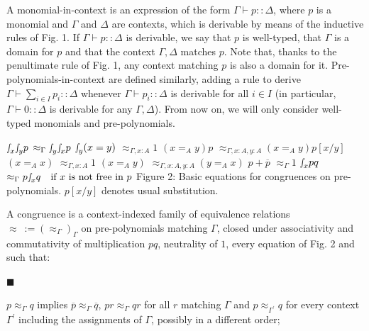  
 
A monomial-in-context is an expression of the form $\Gamma\vdash p::\Delta$, where $p$ is a monomial and $\Gamma$ and $\Delta$ are contexts, which is derivable by means of the inductive rules of Fig. 1. If $\Gamma\vdash p::\Delta$ is derivable, we say that $p$ is well-typed, that $\Gamma$ is a domain for $p$ and that the context $\Gamma,\Delta$ matches $p$. Note that, thanks to the penultimate rule of Fig. 1, any context matching $p$ is also a domain for it. Pre-polynomials-in-context are defined similarly, adding a rule to derive $\Gamma\vdash\sum_{i\in I}p_{i}::\Delta$ whenever $\Gamma\vdash p_{i}::\Delta$ is derivable for all $i\in I$ (in particular, $\Gamma\vdash 0::\Delta$ is derivable for any $\Gamma,\Delta$). From now on, we will only consider well-typed monomials and pre-polynomials.\par
 
 
    $\displaystyle{\smallint\!}_{x}{\smallint\!}_{y}p$ $\displaystyle\approx_{\Gamma}{\smallint\!}_{y}{\smallint\!}_{x}p$ $\displaystyle{\smallint\!}_{y}(x=y)$ $\displaystyle\approx_{\Gamma,x:A}1$     $\displaystyle(x=_{A}y)p$ $\displaystyle\approx_{\Gamma,x:A,y:A}(x=_{A}y)p[x/y]$ $\displaystyle(x=_{A}x)$ $\displaystyle\approx_{\Gamma,x:A}1$     $\displaystyle(x=_{A}y)$ $\displaystyle\approx_{\Gamma,x:A,y:A}(y=_{A}x)$ $\displaystyle p+\overline{p}$ $\displaystyle\approx_{\Gamma}1$     $\displaystyle{\smallint\!}_{x}pq$ $\displaystyle\approx_{\Gamma}p{\smallint\!}_{x}q\quad\text{if $x$ is not free %
in $p$}$    
Figure 2: Basic equations for congruences on pre-polynomials. $p[x/y]$ denotes usual substitution.\par
 
 
 
A congruence is a context-indexed family of equivalence relations $\approx\ :=(\approx_{\Gamma})_{\Gamma}$ on pre-polynomials matching $\Gamma$, closed under associativity and commutativity of multiplication $pq$, neutrality of $1$, every equation of Fig. 2 and such that:\par
  
\par\noindent  $\blacksquare$ 
 
$p\approx_{\Gamma}q$ implies $\overline{p}\approx_{\Gamma}\overline{q}$, $pr\approx_{\Gamma}qr$ for all $r$ matching $\Gamma$ and $p\approx_{\Gamma^{\prime}}q$ for every context $\Gamma^{\prime}$ including the assignments of $\Gamma$, possibly in a different order;\par
 
